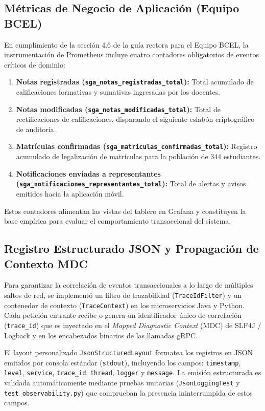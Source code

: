 \documentclass[11pt,a4paper]{article}
\begin{document}
\subsection{M\'etricas de Negocio de Aplicaci\'on (Equipo BCEL)}
En cumplimiento de la secci\'on 4.6 de la gu\'ia rectora para el Equipo BCEL, la instrumentaci\'on de Prometheus incluye cuatro contadores obligatorios de eventos cr\'iticos de dominio:
\begin{enumerate}
  \item \textbf{Notas registradas (\texttt{sga\_notas\_registradas\_total}):} Total acumulado de calificaciones formativas y sumativas ingresadas por los docentes.
  \item \textbf{Notas modificadas (\texttt{sga\_notas\_modificadas\_total}):} Total de rectificaciones de calificaciones, disparando el siguiente eslab\'on criptogr\'afico de auditor\'ia.
  \item \textbf{Matr\'iculas confirmadas (\texttt{sga\_matriculas\_confirmadas\_total}):} Registro acumulado de legalizaci\'on de matr\'iculas para la poblaci\'on de 344 estudiantes.
  \item \textbf{Notificaciones enviadas a representantes (\texttt{sga\_notificaciones\_representantes\_total}):} Total de alertas y avisos emitidos hacia la aplicaci\'on m\'ovil.
\end{enumerate}
Estos contadores alimentan las vistas del tablero en Grafana y constituyen la base emp\'irica para evaluar el comportamiento transaccional del sistema.

\subsection{Registro Estructurado JSON y Propagaci\'on de Contexto MDC}
Para garantizar la correlaci\'on de eventos transaccionales a lo largo de m\'ultiples saltos de red, se implement\'o un filtro de trazabilidad (\texttt{TraceIdFilter}) y un contenedor de contexto (\texttt{TraceContext}) en los microservicios Java y Python. Cada petici\'on entrante recibe o genera un identificador \'unico de correlaci\'on (\texttt{trace\_id}) que es inyectado en el \textit{Mapped Diagnostic Context} (MDC) de SLF4J / Logback y en los encabezados binarios de las llamadas gRPC.

El layout personalizado \texttt{JsonStructuredLayout} formatea los registros en JSON emitidos por consola estándar (\texttt{stdout}), incluyendo los campos: \texttt{timestamp}, \texttt{level}, \texttt{service}, \texttt{trace\_id}, \texttt{thread}, \texttt{logger} y \texttt{message}. La emisi\'on estructurada es validada autom\'aticamente mediante pruebas unitarias (\texttt{JsonLoggingTest} y \texttt{test\_observability.py}) que comprueban la presencia ininterrumpida de estos campos.
\end{document}
